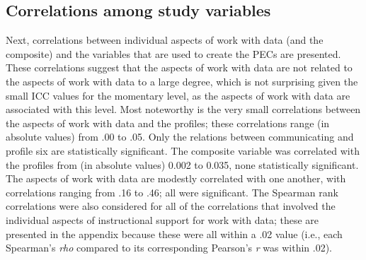 \documentclass[]{msu-thesis}
\theoremstyle{definition}
\theoremstyle{definition}
\theoremstyle{definition}
\theoremstyle{remark}
\begin{document}
\subsection{Correlations among study
variables}\label{correlations-among-study-variables}

Next, correlations between individual aspects of work with data (and the
composite) and the variables that are used to create the PECs are
presented. These correlations suggest that the aspects of work with data
are not related to the aspects of work with data to a large degree,
which is not surprising given the small ICC values for the momentary
level, as the aspects of work with data are associated with this level.
Most noteworthy is the very small correlations between the aspects of
work with data and the profiles; these correlations range (in absolute
values) from .00 to .05. Only the relations between communicating and
profile six are statistically significant. The composite variable was
correlated with the profiles from (in absolute values) 0.002 to 0.035,
none statistically significant. The aspects of work with data are
modestly correlated with one another, with correlations ranging from .16
to .46; all were significant. The Spearman rank correlations were also
considered for all of the correlations that involved the individual
aspects of instructional support for work with data; these are presented
in the appendix because these were all within a .02 value (i.e., each
Spearman's \emph{rho} compared to its corresponding Pearson's \emph{r}
was within .02).

\begin{landscape}\begin{table}

\caption{\label{tab:rq2-1-corr-components}Correlations among study variables}
\centering
{}
\end{table}
\end{landscape}
\end{document}
